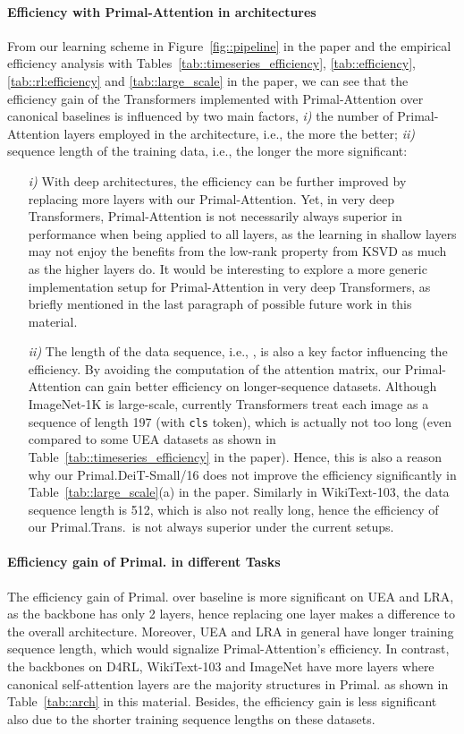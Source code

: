 \documentclass{article}
\begin{document}
\paragraph{Efficiency with Primal-Attention in architectures} From our learning scheme in Figure~\ref{fig::pipeline} in the paper and the empirical efficiency analysis 
with Tables~\ref{tab::timeseries_efficiency}, \ref{tab::efficiency}, \ref{tab::rl:efficiency} and \ref{tab::large_scale} in the paper, we can see that the efficiency gain of the Transformers implemented with Primal-Attention 
over canonical baselines is influenced by two main factors,
\textit{i)} the number of Primal-Attention layers employed in the architecture, i.e., the more the better; 
\textit{ii)} sequence length of the training data, i.e., the longer the more significant:
\begin{itemize}
\item[\emph{i)}] With deep architectures, the efficiency can be further improved by replacing more layers with our Primal-Attention. 
Yet, in very deep Transformers, Primal-Attention is not necessarily always superior in performance when being applied to all layers, as the learning in shallow layers may not enjoy the benefits from the low-rank property from KSVD as much as the higher layers do. 
It would be interesting to explore a more generic implementation setup for Primal-Attention in very deep Transformers, as briefly mentioned in the last paragraph of possible future work in this material.
\item[\emph{ii)}] The length of the data sequence, i.e., , is also a key factor influencing the efficiency. 
By avoiding the computation of the  attention matrix, our Primal-Attention can gain better efficiency on longer-sequence datasets. 
Although ImageNet-1K is large-scale, currently Transformers treat each image as a sequence of length 197 (with {\tt cls} token), which is actually not too long (even compared to some UEA datasets as shown in Table~\ref{tab::timeseries_efficiency} in the paper). 
Hence, this is also a reason why our Primal.DeiT-Small/16 does not improve the efficiency significantly in Table~\ref{tab::large_scale}(a) in the paper. 
Similarly in WikiText-103, the data sequence length is 512, which is also not really long, hence the efficiency of our Primal.Trans.~is not always superior under the current setups.
\end{itemize}
\paragraph{Efficiency gain of Primal. in different Tasks}
The efficiency gain of Primal. over baseline is more significant on UEA and LRA, as the backbone has only 2 layers, hence replacing one layer makes a difference to the overall architecture. 
Moreover, UEA and LRA in general have longer training sequence length, which would signalize Primal-Attention's efficiency. 
In contrast, the backbones on D4RL, WikiText-103 and ImageNet have more layers where canonical self-attention layers are the majority structures in Primal. as shown in Table~\ref{tab::arch} in this material. 
Besides, the efficiency gain is less significant also due to the shorter training sequence lengths on these datasets. 
\end{document}
